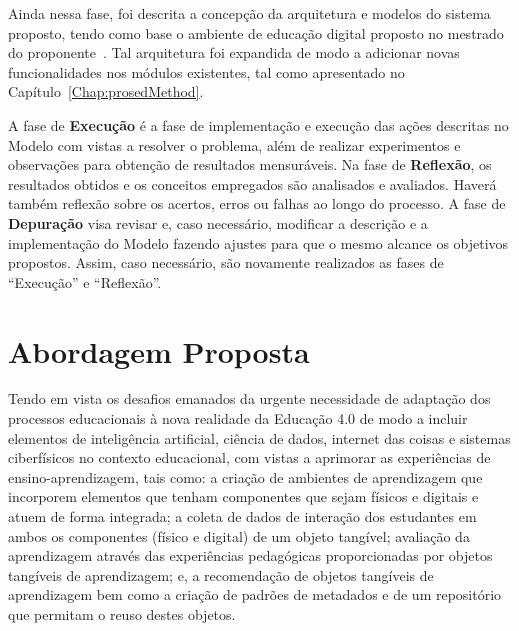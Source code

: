 
Ainda nessa fase, foi descrita a concepção da arquitetura e modelos do sistema proposto, tendo como base o ambiente de educação digital proposto no mestrado do proponente~\citep{leitao:2017}. Tal arquitetura foi expandida de modo a adicionar novas funcionalidades nos módulos existentes, tal como apresentado no Capítulo~\ref{Chap:prosedMethod}.

A fase de \textbf{Execução} é a fase de implementação e execução das ações descritas no Modelo com vistas a resolver o problema, além de realizar experimentos e observações para obtenção de resultados mensuráveis. Na fase de \textbf{Reflexão}, os resultados obtidos e os conceitos empregados são analisados e avaliados. Haverá também reflexão sobre os acertos, erros ou falhas ao longo do processo. A fase de \textbf{Depuração} visa revisar e, caso necessário, modificar a descrição e a implementação do Modelo fazendo ajustes para que o mesmo alcance os objetivos propostos. Assim, caso necessário, são novamente realizados as fases de ``Execução'' e ``Reflexão''.

\section{Abordagem Proposta}

Tendo em vista os desafios emanados da urgente necessidade de adaptação dos processos educacionais à nova realidade da Educação 4.0 de modo a incluir elementos de inteligência artificial, ciência de dados, internet das coisas e sistemas ciberfísicos no contexto educacional, com vistas a aprimorar as experiências de ensino-aprendizagem, tais como: a criação de ambientes de aprendizagem que incorporem elementos que tenham componentes que sejam físicos e digitais  e atuem de forma integrada; a coleta de dados de interação dos estudantes em ambos os componentes (físico e digital) de um objeto tangível; avaliação da aprendizagem através das experiências pedagógicas proporcionadas por objetos tangíveis de aprendizagem; e, a recomendação de objetos tangíveis de aprendizagem bem como a criação de padrões de metadados e de um repositório que permitam o reuso destes objetos.


